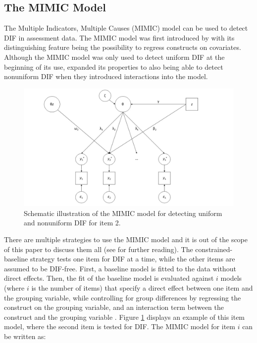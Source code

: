 \documentclass{article}
\begin{document}
\subsection{The MIMIC Model} \label{sec:mimic}
The Multiple Indicators, Multiple Causes (MIMIC) model can be used to detect DIF in assessment data. The MIMIC model was first introduced by \citet{joreskog1975estimation} with its distinguishing feature being the possibility to regress constructs on covariates. Although the MIMIC model was only used to detect uniform DIF at the beginning of its use, \citet{woods2009illustration} expanded its properties to also being able to detect nonuniform DIF when they introduced interactions into the model.   

\begin{figure}[!ht]
    \centering
    \includegraphics[scale = 0.45]{MIMIC_model.jpg}
    \caption{Schematic illustration of the MIMIC model for detecting uniform and nonuniform DIF for item 2.}
    \label{fig:mimicmodel}
\end{figure}

There are multiple strategies to use the MIMIC model and it is out of the scope of this paper to discuss them all (see \citet{lee2018methodological} for further reading). The constrained-baseline strategy tests one item for DIF at a time, while the other items are assumed to be DIF-free. First, a baseline model is fitted to the data without direct effects. Then, the fit of the baseline model is evaluated against $i$ models (where $i$ is the number of items) that specify a direct effect between one item and the grouping variable, while controlling for group differences by regressing the construct on the grouping variable, and an interaction term between the construct and the grouping variable \citep{lee2018methodological}. Figure \ref{fig:mimicmodel} displays an example of this item model, where the second item is tested for DIF. The MIMIC model for item $i$ can be written as:
\end{document}
